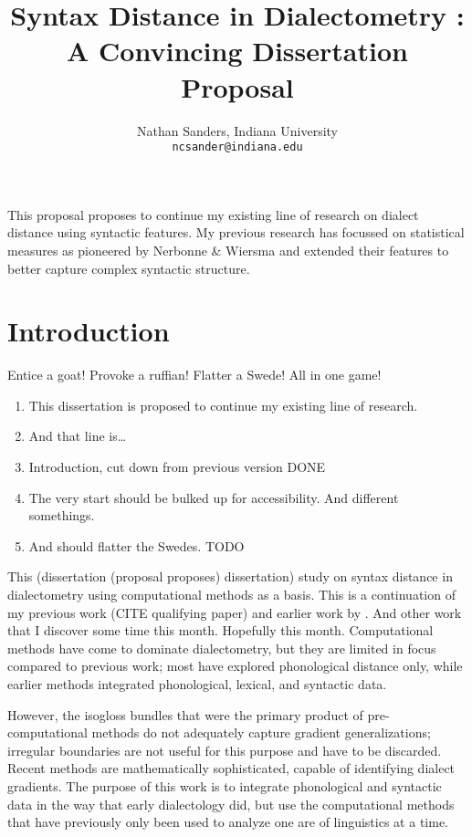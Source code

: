 \documentclass[11pt]{article}
\author{Nathan Sanders, Indiana University \\ \tt{ncsander@indiana.edu}}
\title{Syntax Distance in Dialectometry : A Convincing Dissertation
  Proposal}
\begin{document}
\maketitle

This proposal proposes to continue my existing line of research on
dialect distance using syntactic features. My previous research has
focussed on statistical measures as pioneered by Nerbonne \& Wiersma
and extended their features to better capture complex syntactic
structure.

\section{Introduction}

Entice a goat! Provoke a ruffian! Flatter a Swede! All in one game!

\begin{enumerate}
\item This dissertation is proposed to continue my existing line of research.
\item And that line is\ldots
\item Introduction, cut down from previous version DONE
\item The very start should be bulked up for accessibility. And
  different somethings.
\item And should flatter the Swedes. TODO
\end{enumerate}

This (dissertation (proposal proposes) dissertation) study on syntax
distance in dialectometry using computational methods as a basis. This
is a continuation of my previous work (CITE qualifying paper) and
earlier work by . And other work that I discover
some time this month. Hopefully this month. Computational methods have
come to dominate dialectometry, but they are limited in focus compared
to previous work; most have explored phonological distance only, while
earlier methods integrated phonological, lexical, and syntactic data.

However, the isogloss bundles that were the primary product of
pre-computational methods do not adequately capture gradient
generalizations; irregular boundaries are not useful for this purpose
and have to be discarded. Recent methods are mathematically
sophisticated, capable of identifying dialect gradients. The purpose
of this work is to integrate phonological and syntactic data in the
way that early dialectology did, but use the computational methods
that have previously only been used to analyze one are of linguistics
at a time.
\end{document}
